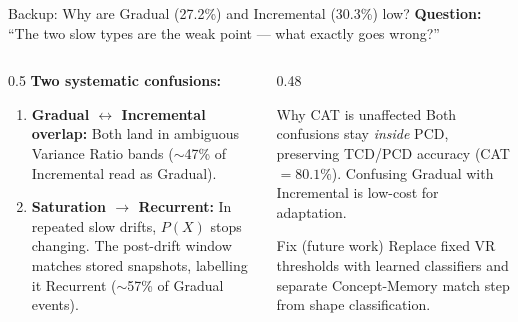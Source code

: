 \documentclass[aspectratio=169,10pt]{beamer}
\begin{document}
\begin{frame}{Backup: Why are Gradual (27.2\%) and Incremental (30.3\%) low?}
	\textbf{Question:} ``The two slow types are the weak point --- what exactly goes wrong?''

	\vspace{0.5em}
	\begin{columns}[T]
		\begin{column}{0.5\textwidth}
			\textbf{Two systematic confusions:}
			\begin{enumerate}
				\small
				\item \textbf{Gradual $\leftrightarrow$ Incremental overlap:} Both land in ambiguous Variance Ratio bands ($\sim$47\% of Incremental read as Gradual).
				\item \textbf{Saturation $\to$ Recurrent:} In repeated slow drifts, $P(X)$ stops changing. The post-drift window matches stored snapshots, labelling it Recurrent ($\sim$57\% of Gradual events).
			\end{enumerate}
		\end{column}
		\begin{column}{0.48\textwidth}
			\begin{exampleblock}{\small Why CAT is unaffected}
				\small
				Both confusions stay \emph{inside} PCD, preserving TCD/PCD accuracy (CAT $=80.1\%$). Confusing Gradual with Incremental is low-cost for adaptation.
			\end{exampleblock}

			\vspace{0.3em}
			\begin{alertblock}{\small Fix (future work)}
				\scriptsize
				Replace fixed VR thresholds with learned classifiers and separate Concept-Memory match step from shape classification.
			\end{alertblock}
		\end{column}
	\end{columns}
\end{frame}
\end{document}
